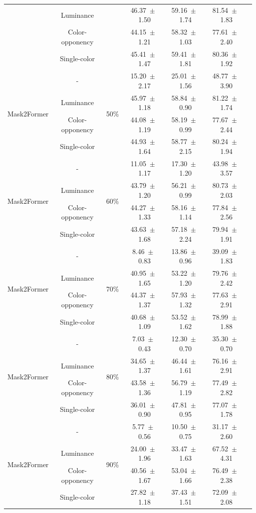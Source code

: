 \begin{table}[h]
\begin{tabular}{@{}lccc ccc@{}}
& Luminance & & 46.37~$\pm$~1.50 & 59.16~$\pm$~1.74 & 81.54~$\pm$~1.83 \\
& Color-opponency & & 44.15~$\pm$~1.21 & 58.32~$\pm$~1.03 & 77.61~$\pm$~2.40 \\
& Single-color & & 45.41~$\pm$~1.47 & 59.41~$\pm$~1.81 & 80.36~$\pm$~1.92 \\
\midrule
\multirow{4}{*}{Mask2Former} & - & \multirow{4}{*}{50\%} & 15.20~$\pm$~2.17 & 25.01~$\pm$~1.56 & 48.77~$\pm$~3.90 \\
& Luminance & & 45.97~$\pm$~1.18 & 58.84~$\pm$~0.90 & 81.22~$\pm$~1.74 \\
& Color-opponency & & 44.08~$\pm$~1.19 & 58.19~$\pm$~0.99 & 77.67~$\pm$~2.44 \\
& Single-color & & 44.93~$\pm$~1.64 & 58.77~$\pm$~2.15 & 80.24~$\pm$~1.94 \\
\midrule
\multirow{4}{*}{Mask2Former} & - & \multirow{4}{*}{60\%} & 11.05~$\pm$~1.17 & 17.30~$\pm$~1.20 & 43.98~$\pm$~3.57 \\
& Luminance & & 43.79~$\pm$~1.20 & 56.21~$\pm$~0.99 & 80.73~$\pm$~2.03 \\
& Color-opponency & & 44.27~$\pm$~1.33 & 58.16~$\pm$~1.14 & 77.84~$\pm$~2.56 \\
& Single-color & & 43.63~$\pm$~1.68 & 57.18~$\pm$~2.24 & 79.94~$\pm$~1.91 \\
\midrule
\multirow{4}{*}{Mask2Former} & - & \multirow{4}{*}{70\%} & 8.46~$\pm$~0.83 & 13.86~$\pm$~0.96 & 39.09~$\pm$~1.83 \\
& Luminance & & 40.95~$\pm$~1.65 & 53.22~$\pm$~1.20 & 79.76~$\pm$~2.42 \\
& Color-opponency & & 44.37~$\pm$~1.37 & 57.93~$\pm$~1.32 & 77.63~$\pm$~2.91 \\
& Single-color & & 40.68~$\pm$~1.09 & 53.52~$\pm$~1.62 & 78.99~$\pm$~1.88 \\
\midrule
\multirow{4}{*}{Mask2Former} & - & \multirow{4}{*}{80\%} & 7.03~$\pm$~0.43 & 12.30~$\pm$~0.70 & 35.30~$\pm$~0.70 \\
& Luminance & & 34.65~$\pm$~1.37 & 46.44~$\pm$~1.61 & 76.16~$\pm$~2.91 \\
& Color-opponency & & 43.58~$\pm$~1.36 & 56.79~$\pm$~1.19 & 77.49~$\pm$~2.82 \\
& Single-color & & 36.01~$\pm$~0.90 & 47.81~$\pm$~0.95 & 77.07~$\pm$~1.78 \\
\midrule
\multirow{4}{*}{Mask2Former} & - & \multirow{4}{*}{90\%} & 5.77~$\pm$~0.56 & 10.50~$\pm$~0.75 & 31.17~$\pm$~2.60 \\
& Luminance & & 24.00~$\pm$~1.96 & 33.47~$\pm$~1.63 & 67.52~$\pm$~4.31 \\
& Color-opponency & & 40.56~$\pm$~1.67 & 53.04~$\pm$~1.66 & 76.49~$\pm$~2.38 \\
& Single-color & & 27.82~$\pm$~1.18 & 37.43~$\pm$~1.51 & 72.09~$\pm$~2.08 \\
\midrule
\bottomrule
\end{tabular}
\label{tab:sparse_results_mask2former_acdc_full}
\end{table}